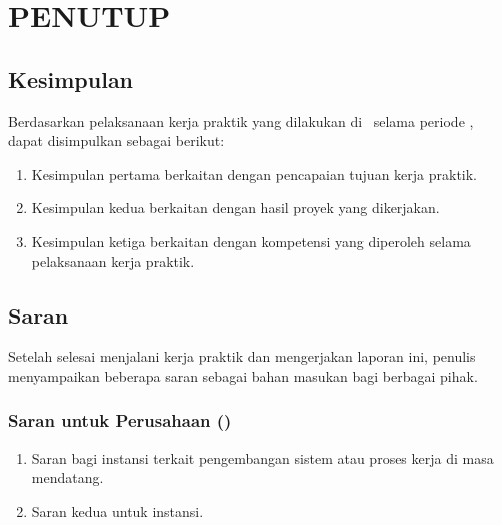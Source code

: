 \chapter{PENUTUP}

\section{Kesimpulan}

Berdasarkan pelaksanaan kerja praktik yang dilakukan di \NamaPerusahaan\ selama
periode \PeriodeKP, dapat disimpulkan sebagai berikut:

\begin{enumerate}[label=\arabic*., leftmargin=*, itemsep=0pt]
  \item Kesimpulan pertama berkaitan dengan pencapaian tujuan kerja praktik.
  \item Kesimpulan kedua berkaitan dengan hasil proyek yang dikerjakan.
  \item Kesimpulan ketiga berkaitan dengan kompetensi yang diperoleh selama
        pelaksanaan kerja praktik.
\end{enumerate}

\section{Saran}

Setelah selesai menjalani kerja praktik dan mengerjakan laporan ini, penulis
menyampaikan beberapa saran sebagai bahan masukan bagi berbagai pihak.

\subsection{Saran untuk Perusahaan (\NamaPerusahaan)}

\begin{enumerate}[label=\arabic*., leftmargin=*, itemsep=0pt]
  \item Saran bagi instansi terkait pengembangan sistem atau proses kerja
        di masa mendatang.
  \item Saran kedua untuk instansi.
\end{enumerate}

